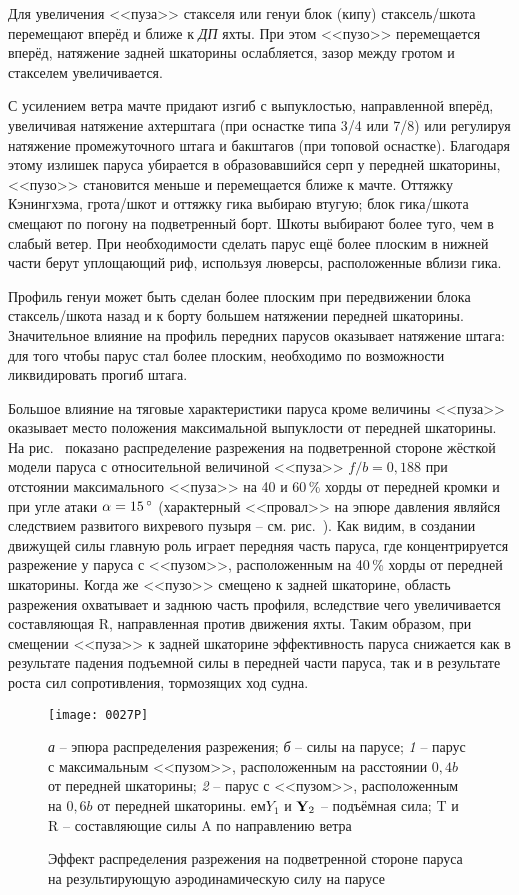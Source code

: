 Для увеличения <<пуза>> стакселя или генуи блок (кипу) стаксель\-/шкота перемещают вперёд и ближе к \textit{ДП} яхты. При этом <<пузо>> перемещается вперёд, натяжение задней шкаторины ослабляется, зазор между гротом и стакселем увеличивается. 

С усилением ветра мачте придают изгиб с выпуклостью, направленной вперёд, увеличивая натяжение ахтерштага (при оснастке типа 3/4 или 7/8) или регулируя натяжение промежуточного штага и бакштагов (при топовой оснастке). Благодаря этому излишек паруса убирается в образовавшийся серп у передней шкаторины, <<пузо>> становится меньше и перемещается ближе к мачте. Оттяжку Кэнингхэма, грота\-/шкот и оттяжку гика выбираю втугую; блок гика\-/шкота смещают по погону на подветренный борт. Шкоты выбирают более туго, чем в слабый ветер. При необходимости сделать парус ещё более плоским в нижней части берут уплощающий риф, используя люверсы, расположенные вблизи гика.

Профиль генуи может быть сделан более плоским при передвижении блока стаксель\-/шкота назад и к борту большем натяжении передней шкаторины. Значительное влияние на профиль передних парусов оказывает натяжение штага: для того чтобы парус стал более плоским, необходимо по возможности ликвидировать прогиб штага.

Большое влияние на тяговые характеристики паруса кроме величины <<пуза>> оказывает место положения максимальной выпуклости от передней шкаторины. На рис.~ показано распределение разрежения на подветренной стороне жёсткой модели паруса с относительной величиной <<пуза>> $f/b = 0,188$ при отстоянии максимального <<пуза>> на 40 и 60\,\% хорды от передней кромки и при угле атаки $\alpha = 15\,^\circ$ (характерный <<провал>> на эпюре давления являйся следствием развитого вихревого пузыря \--- см. рис.~). Как видим, в создании движущей силы главную роль играет передняя часть паруса, где концентрируется разрежение у паруса с <<пузом>>, расположенным на 40\,\% хорды от передней шкаторины. Когда же <<пузо>> смещено к задней шкаторине, область разрежения охватывает и заднюю часть профиля, вследствие чего увеличивается составляющая \ve R, направленная против движения яхты. Таким образом, при смещении <<пуза>> к задней шкаторине эффективность паруса снижается как в результате падения подъемной силы в передней части паруса, так и в результате роста сил сопротивления, тормозящих ход судна.

\begin{figure}[htb]
  \centering
  \texttt{[image: 0027P]}
  \caption{Эффект распределения разрежения на подветренной стороне паруса на результирующую аэродинамическую силу на парусе}
  \label{fig:27}
  \small
  \centering{}
  \textit{а} \--- эпюра распределения разрежения; \textit{б} \--- силы на парусе; \textit{1} \--- парус с максимальным <<пузом>>, расположенным на расстоянии $0,4 b$ от передней шкаторины; \textit{2} \--- парус с <<пузом>>, расположенным на $0,6 b$ от передней шкаторины. $ем Y_1$ и $\mathbf{Y}_2$ \--- подъёмная сила; \ve T и \ve R \--- составляющие силы \ve A по направлению ветра
\end{figure}

